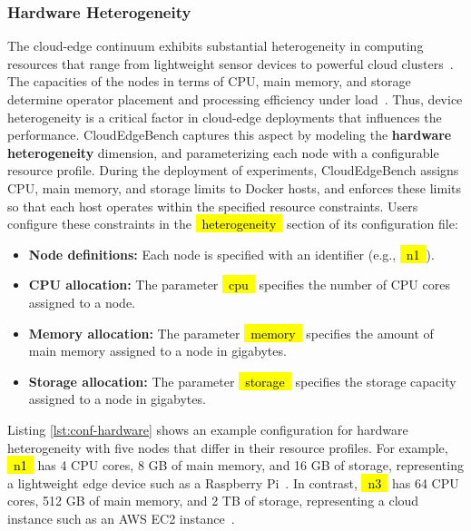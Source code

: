 \documentclass[runningheads]{llncs}
\newcommand*{\codebox}[1]{{\ttfamily\hyphenchar\font=45\relax\hl{~#1~}}}
\begin{document}
\subsubsection{Hardware Heterogeneity}
The cloud-edge continuum exhibits substantial heterogeneity in computing resources that range from lightweight sensor devices to powerful cloud clusters~\cite {sps_survey_2024}.
The capacities of the nodes in terms of CPU, main memory, and storage determine operator placement and processing efficiency under load~\cite{cec-survey-2}.
Thus, device heterogeneity is a critical factor in cloud-edge deployments that influences the performance.
CloudEdgeBench captures this aspect by modeling the \textbf{hardware heterogeneity} dimension, and parameterizing each node with a configurable resource profile.
During the deployment of experiments, CloudEdgeBench assigns CPU, main memory, and storage limits to Docker hosts, and enforces these limits so that each host operates within the specified resource constraints.
Users configure these constraints in the \codebox{heterogeneity} section of its configuration file:
\begin{itemize}
    \item \textbf{Node definitions:} Each node is specified with an identifier (e.g., \codebox{n1}).
    \item \textbf{CPU allocation:} The parameter \codebox{cpu} specifies the number of CPU cores assigned to a node.
    \item \textbf{Memory allocation:} The parameter \codebox{memory} specifies the amount of main memory assigned to a node in gigabytes.
    \item \textbf{Storage allocation:} The parameter \codebox{storage} specifies the storage capacity assigned to a node in gigabytes.
\end{itemize}
Listing \ref{lst:conf-hardware} shows an example configuration for hardware heterogeneity with five nodes that differ in their resource profiles.
For example, \codebox{n1} has 4 CPU cores, 8 GB of main memory, and 16 GB of storage, representing a lightweight edge device such as a Raspberry Pi~\cite{raspberrypi_docs_hardware}.
In contrast, \codebox{n3} has 64 CPU cores, 512 GB of main memory, and 2 TB of storage, representing a cloud instance such as an AWS EC2 instance~\cite{vantage_ec2_r7g_metal}. 
\end{document}
